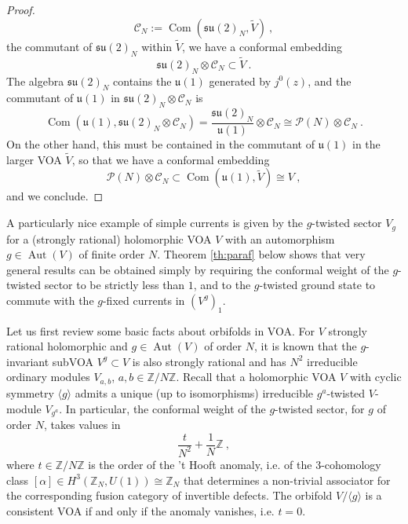 \documentclass[11pt,reqno]{article}
\newcommand{\be}{\begin{equation}}
\newcommand{\ee}{\end{equation}}
\DeclareMathOperator{\Aut}{Aut}
\DeclareMathOperator{\Com}{Com}
\newcommand{\ZZ}{\mathbb{Z}}
\newcommand{\paraf}{\mathcal{P}}
\newcommand{\alg}[1]{\mathfrak{#1}}
\begin{document}
\begin{proof}
	\be \mathcal{C}_N:=\Com(\alg{su}(2)_N,\tilde V)\ ,
	\ee the commutant of $\alg{su}(2)_N$ within $\tilde V$, we have a conformal embedding
	\be  \alg{su}(2)_N\otimes\mathcal{C}_N\subset \tilde V\ .
	\ee The algebra $\alg{su}(2)_N$ contains the $\alg {u}(1)$ generated by $j^0(z)$, and the commutant of $\alg{u}(1)$ in $\alg{su}(2)_N\otimes \mathcal{C}_N$ is 
	\be \Com(\alg{u}(1),\alg{su}(2)_N\otimes\mathcal{C}_N)= \frac{\alg{su}(2)_N}{\alg{u}(1)}\otimes \mathcal{C}_N\cong \paraf(N)\otimes \mathcal{C}_N\ .
	\ee On the other hand, this must be contained in the commutant of $\alg{u}(1)$ in the larger VOA $\tilde V$, so that we have a conformal embedding
	\be \paraf(N)\otimes \mathcal{C}_N\subset \Com(\alg{u}(1),{\tilde V})\cong V\ ,
	\ee and we conclude.
\end{proof}


A particularly nice example of simple currents is given by the $g$-twisted sector $V_g$ for a (strongly rational) holomorphic VOA $V$ with an automorphism $g\in \Aut(V)$ of finite order $N$.  Theorem \ref{th:paraf} below shows that very general results can be obtained simply by requiring the conformal weight of the $g$-twisted sector to be strictly less than $1$, and to the $g$-twisted ground state to commute with the $g$-fixed currents in $(V^g)_1$. 

Let us first review some basic facts about orbifolds in VOA. For $V$ strongly rational holomorphic and $g\in \Aut(V)$ of order $N$, it is known \cite{Carnahan:2016guf,vanEkeren:2017scl} that the $g$-invariant subVOA $V^g \subset V$ is also strongly rational and has $N^2$ irreducible ordinary modules $V_{a,b}$, $a,b\in \ZZ/N\ZZ$. Recall that a holomorphic VOA $V$ with cyclic symmetry $\langle g\rangle$  admits a unique (up to isomorphisms) irreducible $g^a$-twisted $V$-module $V_{g^a}$. In particular, the conformal weight of the $g$-twisted sector, for $g$ of order $N$, takes values in
\be \frac{t}{N^2}+\frac{1}{N}\ZZ\ ,
\ee where $t\in \ZZ/N\ZZ$ is the order of the 't Hooft anomaly, i.e. of the $3$-cohomology class $[\alpha]\in H^3(\ZZ_N,U(1))\cong \ZZ_N$ that determines a non-trivial associator for the corresponding fusion category of invertible defects. The orbifold $V/\langle g\rangle$ is a consistent VOA if and only if the anomaly vanishes, i.e. $t=0$.
\end{document}

